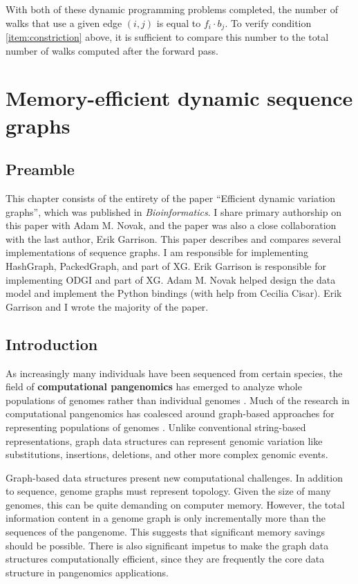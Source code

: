 \documentclass[11pt]{ucthesis}
\newcommand{\vocab}{\textbf}
\begin{document}
With both of these dynamic programming problems completed, the number of walks that use a given edge $(i,j)$ is equal to $f_i \cdot b_j$. To verify condition \ref{item:constriction} above, it is sufficient to compare this number to the total number of walks computed after the forward pass.

\chapter{Memory-efficient dynamic sequence graphs}
\label{chapter:handle}

\section{Preamble}

This chapter consists of the entirety of the paper ``Efficient dynamic variation graphs'', which was published in \emph{Bioinformatics}\cite{eizenga2020efficient}. I share primary authorship on this paper with Adam M. Novak, and the paper was also a close collaboration with the last author, Erik Garrison. This paper describes and compares several implementations of sequence graphs. I am responsible for implementing HashGraph, PackedGraph, and part of XG. Erik Garrison is responsible for implementing ODGI and part of XG. Adam M. Novak helped design the data model and implement the Python bindings (with help from Cecilia Cisar). Erik Garrison and I wrote the majority of the paper.

\section{Introduction}

As increasingly many individuals have been sequenced from certain species, the field of \vocab{computational pangenomics} has emerged to analyze whole populations of genomes rather than individual genomes \cite{computational2018computational}.  
Much of the research in computational pangenomics has coalesced around graph-based approaches for representing populations of genomes \cite{Paten_2017}.
Unlike conventional string-based representations, graph data structures can represent genomic variation like substitutions, insertions, deletions, and other more complex genomic events.

Graph-based data structures present new computational challenges.
In addition to sequence, genome graphs must represent topology.
Given the size of many genomes, this can be quite demanding on computer memory.
However, the total information content in a genome graph is only incrementally more than the sequences of the pangenome.
This suggests that significant memory savings should be possible.
There is also significant impetus to make the graph data structures computationally efficient, since they are frequently the core data structure in pangenomics applications.
\end{document}
